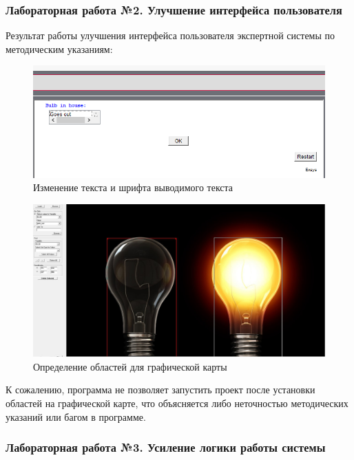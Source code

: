 \documentclass[14pt,a4paper,report]{report}
\begin{document}
\subsubsection{Лабораторная работа №2. Улучшение интерфейса пользователя}

Результат работы улучшения интерфейса пользователя экспертной системы по методическим указаниям:

\begin{figure}[h!]
	\centering
	\includegraphics[scale = 0.75]{images/2_1.png}
	\caption{Изменение текста и шрифта выводимого текста}
\end{figure}

\begin{figure}[h!]
	\centering
	\includegraphics[scale = 0.50]{images/2_2.png}
	\caption{Определение областей для графической карты}
\end{figure}

К сожалению, программа не позволяет запустить проект после установки областей на графической карте, что объясняется либо неточностью методических указаний или багом в программе.

\subsubsection{Лабораторная работа №3. Усиление логики работы системы}
\end{document}
